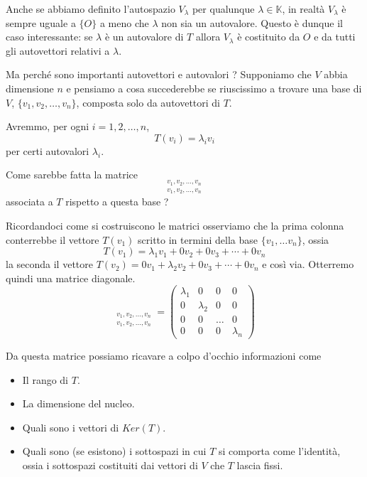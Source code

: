 Anche se abbiamo definito l'autospazio $V_\lambda$ per qualunque
$\lambda \in \mathbb{K}$, in realt\`a $V_\lambda$ \`e sempre uguale a $\{O\}$ a
meno che $\lambda$ non sia un autovalore. Questo \`e dunque il caso interessante:
se $\lambda$ \`e un autovalore di $T$ allora $V_\lambda$ \`e costituito da $O$ e
da tutti gli autovettori relativi a $\lambda$.

Ma perch\'e sono importanti autovettori e autovalori ?
Supponiamo che $V$ abbia dimensione $n$ e pensiamo a cosa succederebbe se
riuscissimo a trovare una base di $V$, $\{v_1, v_2, \dots, v_n\}$, composta solo
da autovettori di $T$.

Avremmo, per ogni $i = 1, 2, \dots, n$,
\begin{equation*}
	T(v_i) = \lambda_i v_i
\end{equation*}
per certi autovalori $\lambda_i$.

Come sarebbe fatta la matrice
\begin{equation*}
	[T]_{\substack{
			v_1, v_2, \dots, v_n \\
			v_1, v_2, \dots, v_n
		}}
\end{equation*}
associata a $T$ rispetto a questa base ?

Ricordandoci come si costruiscono le matrici osserviamo che la prima colonna
conterrebbe il vettore $T(v_1)$ scritto in termini della base $\{v_1, \dots v_n\}$,
ossia
\begin{equation*}
	T(v_1) = \lambda_1 v_1 + 0 v_2 + 0 v_3 + \cdots + 0 v_n
\end{equation*}
la seconda il vettore $T(v_2) = 0 v_1 + \lambda_2 v_2 + 0 v_3 + \cdots + 0 v_n$ e
cos\`i via. Otterremo quindi una matrice diagonale.
\begin{equation*}
	[T]_{\substack{
			v_1, v_2, \dots, v_n \\
			v_1, v_2, \dots, v_n
		}} = \begin{pmatrix}
		\lambda_1 & 0         & 0     & 0         \\
		0         & \lambda_2 & 0     & 0         \\
		0         & 0         & \dots & 0         \\
		0         & 0         & 0     & \lambda_n
	\end{pmatrix}
\end{equation*}

Da questa matrice possiamo ricavare a colpo d'occhio informazioni come
\begin{itemize}
	\item Il rango di $T$.
	\item La dimensione del nucleo.
	\item Quali sono i vettori di $Ker(T)$.
	\item Quali sono (se esistono) i sottospazi in cui $T$ si comporta come l'identit\`a,
	      ossia i sottospazi costituiti dai vettori di $V$ che $T$ lascia fissi.
\end{itemize}

